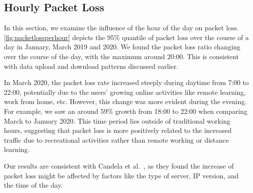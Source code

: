 
\subsection{Hourly Packet Loss}

In this section, we examine the influence of the hour of the day on packet loss. \cref{fig:packetlossperhour} depicts the 95\% quantile of packet loss over the course of a day in January, March 2019 and 2020. We found the packet loss ratio changing over the course of the day, with the maximum around 20:00. This is consistent with data upload and download patterns discussed earlier.

In March 2020, the packet loss rate increased steeply during daytime from 7:00 to 22:00, potentially due to the users' growing online activities like remote learning, work from home, etc. However, this change was more evident during the evening. For example, we saw an around 59\% growth from 18:00 to 22:00 when comparing March to January 2020. This time period lies outside of traditional working hours, suggesting that packet loss is more positively related to the increased traffic due to recreational activities rather than remote working or distance learning.

Our results are consistent with Candela et al.~\cite{Candela2020latency}, as they found the increase of packet loss might be affected by factors like the type of server, \gls{IP} version, and the time of the day.

